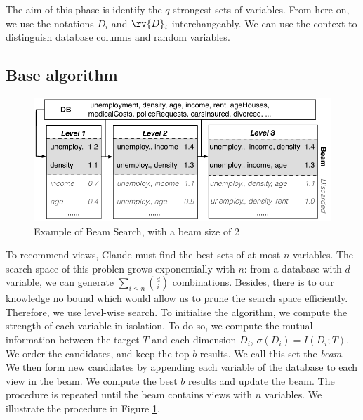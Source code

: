 The aim of this phase is identify the $q$ strongest sets of variables. From
here on, we use the notations $D_i$ and $\rv{D}_i$ interchangeably. We can use
the context to distinguish database columns and random variables.

\subsection{Base algorithm}

\begin{figure}[t!]
\centering
\includegraphics[width=0.8\columnwidth]{images/beam-search}
\caption{Example of Beam Search, with a beam size of 2}
\label{pic:beam-search}
\end{figure}

To recommend views, Claude must find the best sets of at most $n$ variables.
The search space of this problen grows exponentially with $n$: from a database
with $d$ variable, we can generate $\sum_{i \leq n} \binom{d}{i}$ combinations.
Besides, there is to our knowledge no bound which would allow us to prune the
search space efficiently. Therefore, we use level-wise search. To initialise
the algorithm, we compute the strength of each variable in isolation.  To do
so, we compute the mutual information between the target $T$ and each dimension
$D_i$, $\sigma(D_i) =  I(D_i; T)$. We order the candidates, and keep the top
$b$ results. We call this set the \emph{beam}. We then form new candidates by
appending each variable of the database to each view in the beam. We compute
the best $b$ results and update the beam. The procedure is repeated until the
beam contains views with $n$ variables. We illustrate the procedure in Figure
\ref{pic:beam-search}.

